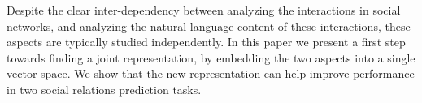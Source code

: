 Despite the clear inter-dependency between analyzing the interactions in social networks, and analyzing the natural language content of these interactions, these aspects are typically studied independently. In this paper we present a first step towards finding a joint representation, by embedding  the two aspects into a single vector space. We show that the new representation can help improve performance in two social relations prediction tasks.
